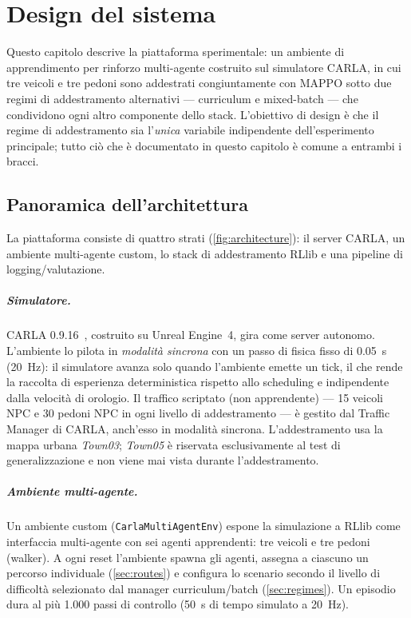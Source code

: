 \chapter{Design del sistema}
\label{ch:system}

Questo capitolo descrive la piattaforma sperimentale: un ambiente di
apprendimento per rinforzo multi-agente costruito sul simulatore CARLA,
in cui tre veicoli e tre pedoni sono addestrati congiuntamente con MAPPO
sotto due regimi di addestramento alternativi --- curriculum e
mixed-batch --- che condividono ogni altro componente dello stack.
L'obiettivo di design è che il regime di addestramento sia l'\emph{unica}
variabile indipendente dell'esperimento principale; tutto ciò che è
documentato in questo capitolo è comune a entrambi i bracci.

\section{Panoramica dell'architettura}
\label{sec:architecture}

La piattaforma consiste di quattro strati (\cref{fig:architecture}): il
server CARLA, un ambiente multi-agente custom, lo stack di addestramento
RLlib e una pipeline di logging/valutazione.

\paragraph{Simulatore.}
CARLA 0.9.16~\cite{dosovitskiy2017carla}, costruito su Unreal Engine~4,
gira come server autonomo. L'ambiente lo pilota in \emph{modalità
sincrona} con un passo di fisica fisso di \SI{0.05}{s} (\SI{20}{Hz}): il
simulatore avanza solo quando l'ambiente emette un tick, il che rende la
raccolta di esperienza deterministica rispetto allo scheduling e
indipendente dalla velocità di orologio. Il traffico scriptato (non
apprendente) --- 15 veicoli NPC e 30 pedoni NPC in ogni livello di
addestramento --- è gestito dal Traffic Manager di CARLA, anch'esso in
modalità sincrona. L'addestramento usa la mappa urbana \emph{Town03};
\emph{Town05} è riservata esclusivamente al test di generalizzazione e
non viene mai vista durante l'addestramento.

\paragraph{Ambiente multi-agente.}
Un ambiente custom (\texttt{CarlaMultiAgentEnv}) espone la simulazione a
RLlib come interfaccia multi-agente con sei agenti apprendenti: tre
veicoli e tre pedoni (walker). A ogni reset l'ambiente spawna gli
agenti, assegna a ciascuno un percorso individuale (\cref{sec:routes}) e
configura lo scenario secondo il livello di difficoltà selezionato dal
manager curriculum/batch (\cref{sec:regimes}). Un episodio dura al più
1{.}000 passi di controllo (\SI{50}{s} di tempo simulato a \SI{20}{Hz}).


